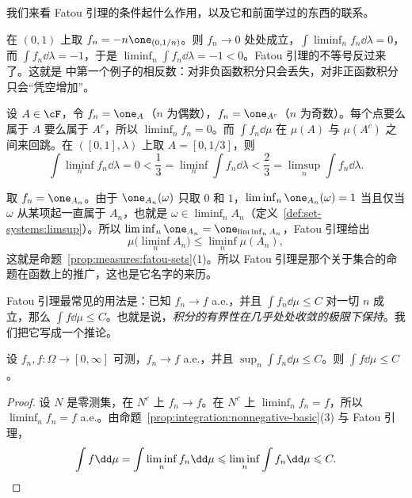 我们来看 Fatou 引理的条件起什么作用，以及它和前面学过的东西的联系。

\begin{example}[非负性不能去掉]
在 $(0,1)$ 上取 $f_n=-n\one_{(0,1/n)}$。则 $f_n\to0$ 处处成立，$\int\liminf_nf_n\dd\lambda=0$，而 $\int f_n\dd\lambda=-1$，于是 $\liminf_n\int f_n\dd\lambda=-1<0$。Fatou 引理的不等号反过来了。这就是 中第一个例子的相反数：对非负函数积分只会丢失，对非正函数积分只会“凭空增加”。
\end{example}

\begin{example}
设 $A\in\cF$，令 $f_n=\one_A$（$n$ 为偶数），$f_n=\one_{A^c}$（$n$ 为奇数）。每个点要么属于 $A$ 要么属于 $A^c$，所以 $\liminf_nf_n=0$。而 $\int f_n\dd\mu$ 在 $\mu(A)$ 与 $\mu(A^c)$ 之间来回跳。在 $([0,1],\lambda)$ 上取 $A=[0,1/3]$，则
\[
\int\liminf_nf_n\dd\lambda=0<\frac13=\liminf_n\int f_n\dd\lambda<\frac23=\limsup_n\int f_n\dd\lambda .
\]
\end{example}

\begin{example}
取 $f_n=\one_{A_n}$。由于 $\one_{A_n}(\omega)$ 只取 $0$ 和 $1$，$\liminf_n\one_{A_n}(\omega)=1$ 当且仅当 $\omega$ 从某项起一直属于 $A_n$，也就是 $\omega\in\liminf_nA_n$（定义~\ref{def:set-systems:limsup}）。所以 $\liminf_n\one_{A_n}=\one_{\liminf_nA_n}$，Fatou 引理给出
\[
\mu\bigl(\liminf_nA_n\bigr)\leqslant\liminf_n\mu(A_n),
\]
这就是命题~\ref{prop:measures:fatou-sets}(1)。所以 Fatou 引理是那个关于集合的命题在函数上的推广，这也是它名字的来历。
\end{example}

Fatou 引理最常见的用法是：已知 $f_n\to f$ a.e.，并且 $\int f_n\dd\mu\leqslant C$ 对一切 $n$ 成立，那么 $\int f\dd\mu\leqslant C$。也就是说，\emph{积分的有界性在几乎处处收敛的极限下保持}。我们把它写成一个推论。

\begin{corollary}\label{cor:integration:fatou-bound}
设 $f_n,f:\Omega\to[0,\infty]$ 可测，$f_n\to f$ a.e.，并且 $\sup_n\int f_n\dd\mu\leqslant C$。则 $\int f\dd\mu\leqslant C$。
\end{corollary}
\begin{proof}
设 $N$ 是零测集，在 $N^c$ 上 $f_n\to f$。在 $N^c$ 上 $\liminf_nf_n=f$，所以 $\liminf_nf_n=f$ a.e.。由命题~\ref{prop:integration:nonnegative-basic}(3) 与 Fatou 引理，
\[
\int f\dd\mu=\int\liminf_nf_n\dd\mu\leqslant\liminf_n\int f_n\dd\mu\leqslant C .\qedhere
\]
\end{proof}

